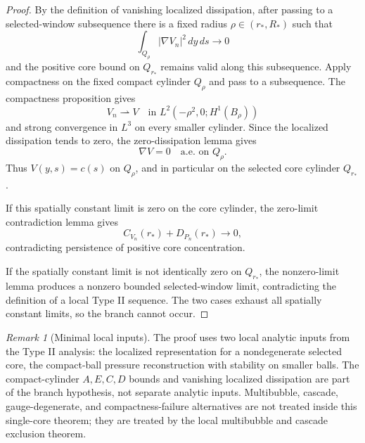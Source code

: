 \documentclass[11pt]{amsart}
\theoremstyle{plain}
\theoremstyle{definition}
\theoremstyle{remark}
\newtheorem{remark}[theorem]{Remark}
\begin{document}
\begin{proof}
By the definition of vanishing localized dissipation, after passing to a
selected-window subsequence there is a fixed radius \(\rho\in(r_*,R_*)\) such
that
\[
  \int_{Q_\rho}|\nabla V_n|^2\,dy\,ds\to0
\]
and the positive core bound on \(Q_{r_*}\) remains valid along this subsequence.
Apply compactness on the fixed compact
cylinder \(Q_\rho\) and pass to a subsequence.  The compactness proposition
gives
\[
  V_n\rightharpoonup V\quad\text{in }L^2(-\rho^2,0;H^1(B_\rho))
\]
and strong convergence in \(L^3\) on every smaller cylinder.  Since the
localized dissipation tends to zero, the zero-dissipation lemma gives
\[
  \nabla V=0\quad\text{a.e. on }Q_\rho.
\]
Thus \(V(y,s)=c(s)\) on \(Q_\rho\), and in particular on the selected core
cylinder \(Q_{r_*}\).

If this spatially constant limit is zero on the core cylinder, the zero-limit
contradiction lemma gives
\[
  C_{V_n}(r_*)+D_{P_n}(r_*)\to0,
\]
contradicting persistence of positive core concentration.

If the spatially constant limit is not identically zero on \(Q_{r_*}\), the
nonzero-limit lemma produces a nonzero bounded selected-window limit, contradicting
the definition of a local Type II sequence.  The two cases exhaust all
spatially constant limits, so the branch cannot occur.
\end{proof}

\begin{remark}[Minimal local inputs]
The proof uses two local analytic inputs from the Type II analysis: the
localized representation for a nondegenerate selected core, the compact-ball
pressure reconstruction with stability on smaller balls.  The
compact-cylinder \(A,E,C,D\) bounds and vanishing localized dissipation are
part of the branch hypothesis, not separate analytic inputs.  Multibubble,
cascade, gauge-degenerate, and compactness-failure alternatives are not treated
inside this single-core theorem; they are treated by the local multibubble and
cascade exclusion theorem.
\end{remark}
\end{document}
